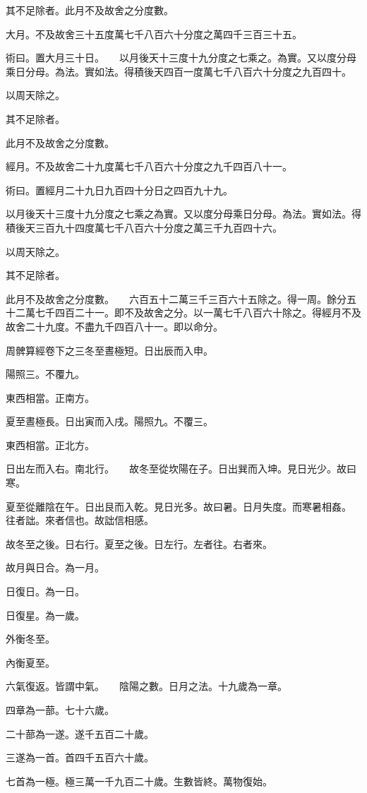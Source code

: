 \documentclass[a4paper,12pt,UTF8,twoside]{ctexbook}
\begin{document}
其不足除者。此月不及故舍之分度數。

大月。不及故舍三十五度萬七千八百六十分度之萬四千三百三十五。

術曰。置大月三十日。　　以月後天十三度十九分度之七乘之。為實。又以度分母乘日分母。為法。實如法。得積後天四百一度萬七千八百六十分度之九百四十。

以周天除之。

其不足除者。

此月不及故舍之分度數。

經月。不及故舍二十九度萬七千八百六十分度之九千四百八十一。

術曰。置經月二十九日九百四十分日之四百九十九。

以月後天十三度十九分度之七乘之為實。又以度分母乘日分母。為法。實如法。得積後天三百九十四度萬七千八百六十分度之萬三千九百四十六。

以周天除之。

其不足除者。

此月不及故舍之分度數。　　六百五十二萬三千三百六十五除之。得一周。餘分五十二萬七千四百二十一。即不及故舍之分。以一萬七千八百六十除之。得經月不及故舍二十九度。不盡九千四百八十一。即以命分。

周髀算經卷下之三冬至晝極短。日出辰而入申。

陽照三。不覆九。

東西相當。正南方。

夏至晝極長。日出寅而入戌。陽照九。不覆三。

東西相當。正北方。

日出左而入右。南北行。　　故冬至從坎陽在子。日出巽而入坤。見日光少。故曰寒。

夏至從離陰在午。日出艮而入乾。見日光多。故曰暑。日月失度。而寒暑相姦。　　往者詘。來者信也。故詘信相感。

故冬至之後。日右行。夏至之後。日左行。左者往。右者來。

故月與日合。為一月。

日復日。為一日。

日復星。為一歲。

外衡冬至。

內衡夏至。

六氣復返。皆謂中氣。　　陰陽之數。日月之法。十九歲為一章。

四章為一蔀。七十六歲。

二十蔀為一遂。遂千五百二十歲。

三遂為一首。首四千五百六十歲。

七首為一極。極三萬一千九百二十歲。生數皆終。萬物復始。
\end{document}
